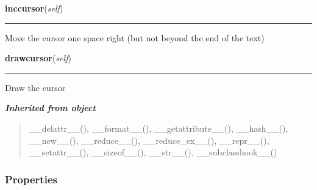 \hspace{.8\funcindent}\begin{boxedminipage}{\funcwidth}

    \raggedright \textbf{inccursor}(\textit{self})

    \vspace{-1.5ex}

    \rule{\textwidth}{0.5\fboxrule}
\setlength{\parskip}{2ex}
    Move the cursor one space right (but not beyond the end of the text)

\setlength{\parskip}{1ex}
    \end{boxedminipage}

    \label{pygame-asteroids:virtual_keyboard:TextInput:drawcursor}

    \vspace{0.5ex}

\hspace{.8\funcindent}\begin{boxedminipage}{\funcwidth}

    \raggedright \textbf{drawcursor}(\textit{self})

    \vspace{-1.5ex}

    \rule{\textwidth}{0.5\fboxrule}
\setlength{\parskip}{2ex}
    Draw the cursor

\setlength{\parskip}{1ex}
    \end{boxedminipage}


\large{\textbf{\textit{Inherited from object}}}

\begin{quote}
\_\_delattr\_\_(), \_\_format\_\_(), \_\_getattribute\_\_(), \_\_hash\_\_(), \_\_new\_\_(), \_\_reduce\_\_(), \_\_reduce\_ex\_\_(), \_\_repr\_\_(), \_\_setattr\_\_(), \_\_sizeof\_\_(), \_\_str\_\_(), \_\_subclasshook\_\_()
\end{quote}


  \subsubsection{Properties}

